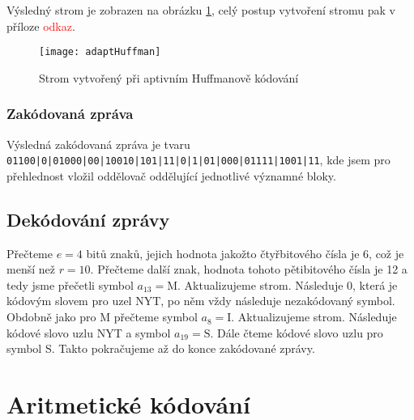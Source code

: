 Výsledný strom je zobrazen na obrázku \ref{adaptivniHuffmanStrom}, celý postup vytvoření stromu pak v příloze \textcolor{red}{odkaz}.

\begin{figure}[!htb]
\centering
\texttt{[image: adaptHuffman]}
\caption{Strom vytvořený při aptivním Huffmanově kódování}
\label{adaptivniHuffmanStrom}
\end{figure}

\subsubsection{Zakódovaná zpráva}
Výsledná zakódovaná zpráva je tvaru \texttt{01100|0|01000|00|10010|101|11|0|1|01|000|01111|1001|11}, kde jsem pro přehlednost vložil oddělovač \uv{\texttt{|}} oddělující jednotlivé významné bloky.

\subsection{Dekódování zprávy}
Přečteme $e=4$ bitů znaků, jejich hodnota jakožto čtyřbitového čísla je 6, což je menší než $r=10$. Přečteme další znak, hodnota tohoto pětibitového čísla je 12 a tedy jsme přečetli symbol $a_{13} = \mathrm{M}$. Aktualizujeme strom. Následuje 0, která je kódovým slovem pro uzel NYT, po něm vždy následuje nezakódovaný symbol. Obdobně jako pro M přečteme symbol $a_8 = \mathrm{I}$. Aktualizujeme strom. Následuje kódové slovo uzlu NYT a symbol $a_{19} = \mathrm{S}$. Dále čteme kódové slovo uzlu pro symbol S. Takto pokračujeme až do konce zakódované zprávy.

\section{Aritmetické kódování}
